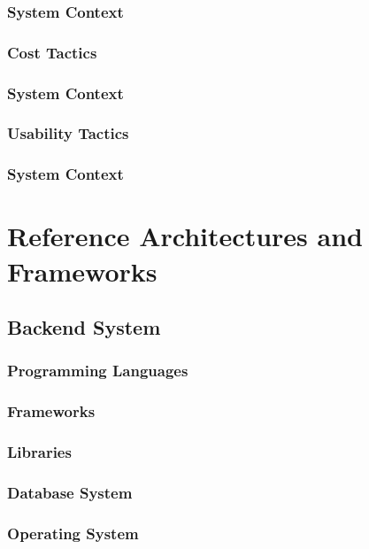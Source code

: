 \documentclass[11pt,fleqn]{book} %
\begin{document}
	\subsection{System Context}
\subsection{Cost Tactics}
	\subsection{System Context}
\subsection{Usability Tactics}
	\subsection{System Context}
	


\chapter{Reference Architectures and Frameworks}
	
	\section{Backend System}
		\subsection{Programming Languages}
		\subsection{Frameworks}
		\subsection{Libraries}
		\subsection{Database System}
		\subsection{Operating System}
\end{document}
